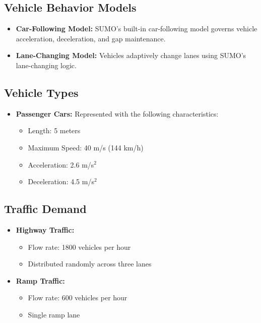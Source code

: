 \documentclass[a4paper, 12pt]{article}
\begin{document}
\subsection{Vehicle Behavior Models}
\begin{itemize}
    \item \textbf{Car-Following Model:} SUMO's built-in car-following model governs vehicle acceleration, deceleration, and gap maintenance.
    \item \textbf{Lane-Changing Model:} Vehicles adaptively change lanes using SUMO's lane-changing logic.
\end{itemize}

\subsection{Vehicle Types}
\begin{itemize}
    \item \textbf{Passenger Cars:} Represented with the following characteristics:
    \begin{itemize}
        \item Length: 5 meters
        \item Maximum Speed: 40 m/s (144 km/h)
        \item Acceleration: 2.6 m/s\(^2\)
        \item Deceleration: 4.5 m/s\(^2\)
    \end{itemize}
\end{itemize}

\subsection{Traffic Demand}
\begin{itemize}
    \item \textbf{Highway Traffic:}
    \begin{itemize}
        \item Flow rate: 1800 vehicles per hour
        \item Distributed randomly across three lanes
    \end{itemize}
    \item \textbf{Ramp Traffic:}
    \begin{itemize}
        \item Flow rate: 600 vehicles per hour
        \item Single ramp lane
    \end{itemize}
\end{itemize}
\end{document}
